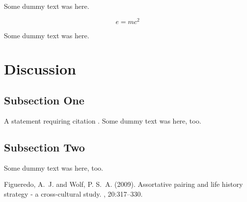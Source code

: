 \documentclass[twoside,twocolumn]{article}
\begin{document}
Some dummy text was here.

\begin{equation}
\label{eq:emc}
e = mc^2
\end{equation}

Some dummy text was here.


\section{Discussion}

\subsection{Subsection One}

A statement requiring citation \cite{Figueredo:2009dg}.
Some dummy text was here, too.

\subsection{Subsection Two}

Some dummy text was here, too.


\begin{thebibliography}{99} %

Figueredo, A.~J. and Wolf, P. S.~A. (2009).
\newblock Assortative pairing and life history strategy - a cross-cultural
  study.
, 20:317--330.
 
\end{thebibliography}

\end{document}
